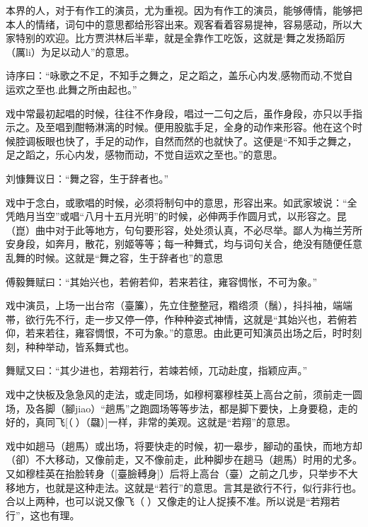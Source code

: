 \documentclass{zhvt-classic}
\begin{document}
本界的人，对于有作工的演员，尤为重视。因为有作工的演员，能够傅情，能够把本人的情绪，词句中的意思都给形容出来。观客看着容易提神，容易感动，所以大家特别的欢迎。比方贾洪林后半辈，就是全靠作工吃饭，这就是‘舞之发扬蹈厉（厲li）为足以动人”的意思。

\begin{preface}
  诗序曰：“咏歌之不足，不知手之舞之，足之蹈之，盖乐心内发,感物而动,不觉自运欢之至也.此舞之所由起也。”
\end{preface}

戏中常最初起唱的时候，往往不作身段，唱过一二句之后，虽作身段，亦只以手指示之。及至唱到酣畅淋漓的时候。便用股肱手足，全身的动作来形容。他在这个时候腔调板眼也快了，手足的动作，自然而然的也就快了。这便是“不知手之舞之，足之蹈之，乐心内发，感物而动，不觉自运欢之至也。”的意思。

\begin{preface}
  刘慷舞议日：“舞之容，生于辞者也。”
\end{preface}

戏中于念白，或歌唱的时候，必须将制句中的意思，形容出来。如武家坡说：“全凭皓月当空”或唱“八月十五月光明”的时候，必伸两手作圆月式，以形容之。昆（崑）曲中对于此等地方，句句要形容，处处须认真，不必尽举。鄙人为梅兰芳所安身段，如奔月，散花，别姬等等；每一种舞式，均与词句关合，绝没有随便任意乱舞的时候。这就是“舞之容，生于辞者也”的意思

\begin{preface}
  傅毅舞赋曰：“其始兴也，若俯若仰，若来若往，雍容惆怅，不可为象。”
\end{preface}

戏中演员，上场一出台帘（臺簾），先立住整整冠，糌绺须（鬚），抖抖袖，端端帯，欲行先不行，走一步又停一停，作种种姿式神情，这就是“其始兴也，若俯若仰，若来若往，雍容惆恨，不可为象。”的意思。由此更可知演员出场之后，时时刻刻，种种举动，皆系舞式也。

\begin{preface}
  舞赋又曰：“其少进也，若翔若行，若竦若倾，兀动赴度，指颖应声。”
\end{preface}


戏中之快板及急急风的走法，或走同场，如穆柯寨穆桂英上高台之前，须前走一圆场，及各脚（腳jiao）“趟馬”之跑圆场等等步法，都是脚下要快，上身要稳，走的好的，真同飞[（𮸽）（飝）]一样，非常的美观。这就是“若翔”的意思。

戏中如趟马（趟馬）或出场，将要快走的时候，初一皋步，腳动的虽快，而地方却（卻）不大移动，又像前走，又不像前走，此种脚步在趟马（趟馬）时用的尤多。又如穆桂英在抬脸转身（[臺臉𨍭身]）后将上高台（臺）之前之几步，只举步不大移地方，也就是这种走法。这就是“若行”的意思。言其是欲行不行，似行非行也。合以上两种，也可以说又像飞（𮸽）又像走的让人捉揍不准。所以说是“若翔若行”，这也有理。
\end{document}
